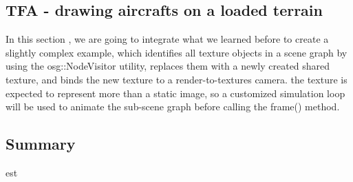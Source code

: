 \documentclass[a4paper,12pt]{book}
\begin{document}
\subsection{TFA - drawing aircrafts on a loaded terrain}
In this section , we are going to integrate what we learned before to create a slightly complex example, which identifies all texture objects in a scene graph by using the osg::NodeVisitor utility, replaces them with a newly created shared texture, and binds the new texture to a render-to-textures camera. the texture is expected to represent more than a static image, so a customized simulation loop will be used to animate the sub-scene graph before calling the frame() method.

\subsection{Summary}

est
\end{document}
